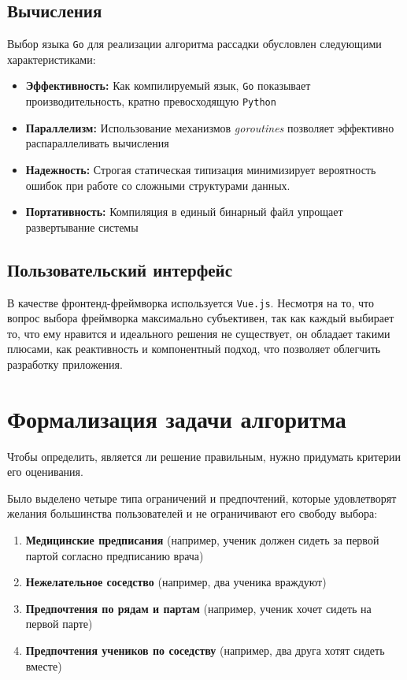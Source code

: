 \documentclass[12pt,a4paper]{extarticle} %
\begin{document}
	\subsection{Вычисления}
	Выбор языка \texttt{Go} для реализации алгоритма рассадки обусловлен следующими характеристиками:
	\begin{itemize}
		\item \textbf{Эффективность:} Как компилируемый язык, \texttt{Go} показывает производительность, кратно превосходящую \texttt{Python} \cite{benchmarks_game}
		\item \textbf{Параллелизм:} Использование механизмов \textit{goroutines} позволяет эффективно распараллеливать вычисления
		\item \textbf{Надежность:} Строгая статическая типизация минимизирует вероятность ошибок при работе со сложными структурами данных.
		\item \textbf{Портативность:} Компиляция в единый бинарный файл упрощает развертывание системы
	\end{itemize}
	
	\subsection{Пользовательский интерфейс}
	В качестве фронтенд-фреймворка используется \texttt{Vue.js}. Несмотря на то, что вопрос выбора фреймворка максимально субъективен, так как каждый выбирает то, что ему нравится и идеального решения не существует, он обладает такими плюсами, как реактивность и компонентный подход, что позволяет облегчить разработку приложения.
	
	\section{Формализация задачи алгоритма}
	\label{sec:formalization}
	Чтобы определить, является ли решение правильным, нужно придумать критерии его оценивания.
	
	Было выделено четыре типа ограничений и предпочтений, которые удовлетворят желания большинства пользователей и не ограничивают его свободу выбора:
	
	\begin{enumerate}
		\item \textbf{Медицинские предписания} (например, ученик должен сидеть за первой партой согласно предписанию врача)
		\item \textbf{Нежелательное соседство} (например, два ученика враждуют)
		\item \textbf{Предпочтения по рядам и партам} (например, ученик хочет сидеть на первой парте)
		\item \textbf{Предпочтения учеников по соседству} (например, два друга хотят сидеть вместе)
	\end{enumerate}
	
\end{document}
